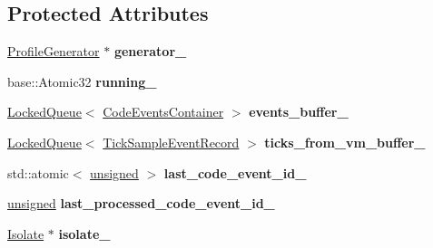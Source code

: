 \subsection*{Protected Attributes}
\begin{DoxyCompactItemize}
\item 
\mbox{\label{classv8_1_1internal_1_1ProfilerEventsProcessor_abe12f8408ec5537032a7bc52b8b3c207}} 
\mbox{\hyperlink{classv8_1_1internal_1_1ProfileGenerator}{Profile\+Generator}} $\ast$ {\bfseries generator\+\_\+}
\item 
\mbox{\label{classv8_1_1internal_1_1ProfilerEventsProcessor_a9d4c8ef93827a88a7d974f818bc9f3d2}} 
base\+::\+Atomic32 {\bfseries running\+\_\+}
\item 
\mbox{\label{classv8_1_1internal_1_1ProfilerEventsProcessor_a665cf1c8f1c968e7e3737f49f8c30d22}} 
\mbox{\hyperlink{classv8_1_1internal_1_1LockedQueue}{Locked\+Queue}}$<$ \mbox{\hyperlink{classv8_1_1internal_1_1CodeEventsContainer}{Code\+Events\+Container}} $>$ {\bfseries events\+\_\+buffer\+\_\+}
\item 
\mbox{\label{classv8_1_1internal_1_1ProfilerEventsProcessor_ab7618f01a46fb423db580f06e65baeb9}} 
\mbox{\hyperlink{classv8_1_1internal_1_1LockedQueue}{Locked\+Queue}}$<$ \mbox{\hyperlink{classv8_1_1internal_1_1TickSampleEventRecord}{Tick\+Sample\+Event\+Record}} $>$ {\bfseries ticks\+\_\+from\+\_\+vm\+\_\+buffer\+\_\+}
\item 
\mbox{\label{classv8_1_1internal_1_1ProfilerEventsProcessor_a4444996d1fa5ffd5d6e8ae225d556544}} 
std\+::atomic$<$ \mbox{\hyperlink{classunsigned}{unsigned}} $>$ {\bfseries last\+\_\+code\+\_\+event\+\_\+id\+\_\+}
\item 
\mbox{\label{classv8_1_1internal_1_1ProfilerEventsProcessor_aea0a102c5b542b8706b2a9076e07f824}} 
\mbox{\hyperlink{classunsigned}{unsigned}} {\bfseries last\+\_\+processed\+\_\+code\+\_\+event\+\_\+id\+\_\+}
\item 
\mbox{\label{classv8_1_1internal_1_1ProfilerEventsProcessor_a6280f9e4b5815a0f7eb04f91cebe225d}} 
\mbox{\hyperlink{classv8_1_1internal_1_1Isolate}{Isolate}} $\ast$ {\bfseries isolate\+\_\+}
\end{DoxyCompactItemize}
